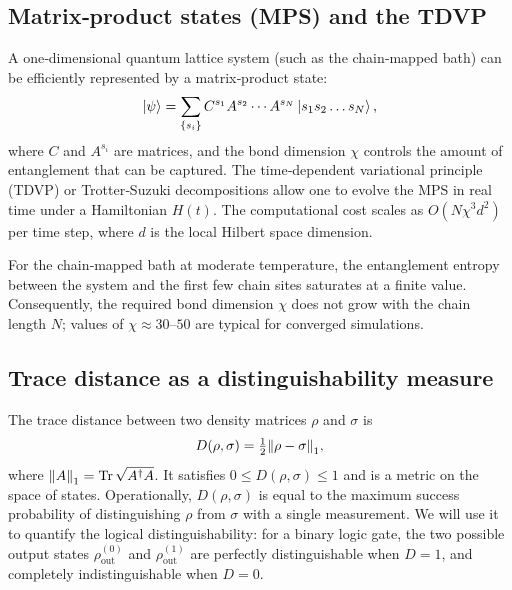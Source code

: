\documentclass[11pt,a4paper]{article}
\theoremstyle{plain}
\theoremstyle{definition}
\theoremstyle{remark}
\begin{document}
\subsection{Matrix‑product states (MPS) and the TDVP}\label{sec:MPS}
A one‑dimensional quantum lattice system (such as the chain‑mapped bath) can be efficiently represented by a matrix‑product state:
\begin{equation}
\ket{\psi} = \sum_{\{s_i\}} C^{s_1} A^{s_2} \cdots A^{s_N} \ket{s_1 s_2 \dots s_N},
\end{equation}
where $C$ and $A^{s_i}$ are matrices, and the bond dimension $\chi$ controls the amount of entanglement that can be captured. The time‑dependent variational principle (TDVP) or Trotter‑Suzuki decompositions allow one to evolve the MPS in real time under a Hamiltonian $H(t)$. The computational cost scales as $O(N\chi^3 d^2)$ per time step, where $d$ is the local Hilbert space dimension.

For the chain‑mapped bath at moderate temperature, the entanglement entropy between the system and the first few chain sites saturates at a finite value. Consequently, the required bond dimension $\chi$ does not grow with the chain length $N$; values of $\chi\approx 30$–$50$ are typical for converged simulations.

\subsection{Trace distance as a distinguishability measure}\label{sec:trace}
The trace distance between two density matrices $\rho$ and $\sigma$ is
\begin{equation}
D(\rho,\sigma) = \tfrac12 \norm{\rho-\sigma}_1,
\end{equation}
where $\norm{A}_1=\Tr\sqrt{A^\dagger A}$. It satisfies $0\le D(\rho,\sigma)\le 1$ and is a metric on the space of states. Operationally, $D(\rho,\sigma)$ is equal to the maximum success probability of distinguishing $\rho$ from $\sigma$ with a single measurement. We will use it to quantify the logical distinguishability: for a binary logic gate, the two possible output states $\rho_{\text{out}}^{(0)}$ and $\rho_{\text{out}}^{(1)}$ are perfectly distinguishable when $D=1$, and completely indistinguishable when $D=0$.
\end{document}
